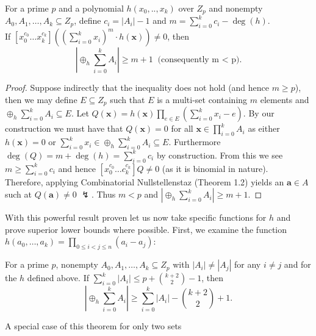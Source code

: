 \begin{theorem} For a prime $p$ and a
	polynomial $h\left( x_0, .., x_{k} \right)$ over $Z_p$ and nonempty
	$A_0, A_1, \ldots, A_{k} \subseteq Z_p$, define  $c_{i} = \left| A_{i}
	\right| -1$ and $m = \sum_{i=0}^{k} c_{i} - \deg \left( h \right)$.\\
	If $[x_0^{c_0}\ldots x_{k}^{c_{k}}]((\sum_{i=0}^{k} x_{i})^{m} \cdot
	h\left( \textbf{x} \right) ) \neq 0$, then \[ \left|  \oplus _h
		\sum_{i=0}^{k}  A_{i} \right| \ge m+1 \ \text{ (consequently m
		< p)} .\] \end{theorem} \begin{proof}[Proof] Suppose indirectly
		that the inequality does not hold (and hence $m \ge p$), then
		we may define $E \subseteq Z_p$ such that $E$ is a multi-set
		containing $m$ elements and $\oplus_h \sum_{i=0}^{k} A_{i}
		\subseteq E$. Let $Q\left( \textbf{x} \right) = h\left(
			\textbf{x} \right) \prod_{e \in E}^{}  \left(
			\sum_{i=0}^{k} x_{i} - e \right)  $.  By our
			construction we must have that $Q\left( \textbf{x}
			\right)  = 0$ for all $\textbf{x} \in \prod_{i=0}^{k}
			A_{i}$ as either $h\left( \textbf{x} \right)  = 0$ or
			$\sum_{i=0}^{k} x_{i} \in \oplus_h \sum_{i=0}^{k}
			A_{i} \subseteq E$. Furthermore $\deg \left( Q \right)
			= m + \deg \left( h \right) = \sum_{i=0}^{k} c_{i}$ by
			construction. From this we see $m \ge \sum_{i=0}^{k}
			c_{i}$ and hence $[x_0^{c_0}\ldots c_{k}^{c_{k}}] Q
			\neq 0$ (as it is binomial in nature).\\ Therefore,
			applying Combinatorial Nullstellenstaz (Theorem 1.2)
			yields an $ \textbf{a}\in A$ such at $Q\left(
			\textbf{a} \right) \neq 0 $ $\lightning$. Thus $m < p$
			and $\left| \oplus _ h \sum_{i=0}^{k}  A_{i}  \right|
			\ge m+1$.  \end{proof} With this powerful result proven
			let us now take specific functions for $h$ and prove
			superior lower bounds where possible. First, we examine
			the function $h\left( a_0, \ldots, a_{k} \right)  =
			\prod_{0\le i < j \le n}^{} \left( a_{i} - a_{j}
			\right) $: \begin{theorem}
				For a prime $p$, nonempty $A_0, A_1, \ldots,
				A_{k} \subseteq Z_p$ with  $\left| A_{i}
				\right| \neq \left| A_{j} \right| $ for any $i
				\neq j$ and for the $h$ defined above. If
				$\sum_{i=0}^{k} \left| A_{i} \right| \le p +
				\binom{k+2}{2} -1$, then \[ \left| \oplus_h
				\sum_{i=0}^{k} A_{i} \right| \ge \sum_{i=0}^{k}
			\left| A_{i} \right| - \binom{k+2}{2} + 1 .\]
		\end{theorem} A special case of this theorem for only two sets
